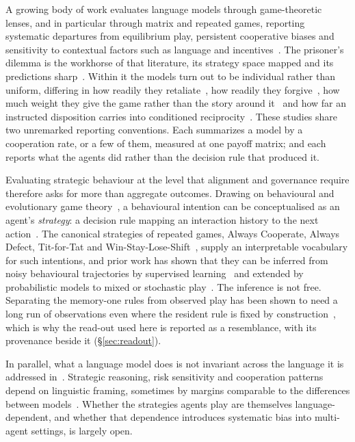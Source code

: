 \documentclass[11pt,a4paper]{article}
\begin{document}
A growing body of work evaluates language models through game-theoretic lenses,
and in particular through matrix and repeated games, reporting systematic
departures from equilibrium play, persistent cooperative biases and sensitivity
to contextual factors such as language and
incentives~\citep{fairgame2025,sun2025gtllm_survey,mao2025alympics,pal2026strategiescooperationdefectionlarge,willis2025will,fan2024can,pires2025large,fu2026optimal}.
The prisoner's dilemma is the workhorse of that literature, its strategy space
mapped and its predictions
sharp~\citep{axelrod1981evolution,axelrod1984evolution,nowak1992tit,nowak1993strategy,nowak2006five,press2012iterated}.
Within it the models turn out to be individual rather than uniform, differing in
how readily they retaliate~\citep{akata2023playing}, how readily they
forgive~\citep{fontana2024nicer}, how much weight they give the game rather than
the story around it~\citep{lore2024strategic} and how far an instructed
disposition carries into conditioned
reciprocity~\citep{phelps2023investigating}. These studies share two unremarked
reporting conventions. Each summarizes a model by a cooperation rate, or a few
of them, measured at one payoff matrix; and each reports what the agents did
rather than the decision rule that produced it.

Evaluating strategic behaviour at the level that alignment and governance
require therefore asks for more than aggregate outcomes. Drawing on behavioural
and evolutionary game theory~\citep{sigmund:2010bo}, a behavioural intention can
be conceptualised as an agent's \emph{strategy}: a decision rule mapping an
interaction history to the next
action~\citep{han2011role,diStefanoIntention2023,Han2012ALIFEjournal,fujimoto2019functional}.
The canonical strategies of repeated games, Always Cooperate, Always Defect,
Tit-for-Tat and Win-Stay-Lose-Shift~\citep{Axelrod1980Effective,sigmund:2010bo},
supply an interpretable vocabulary for such intentions, and prior work has shown
that they can be inferred from noisy behavioural trajectories by supervised
learning~\citep{han2011role,diStefanoIntention2023} and extended by
probabilistic models to mixed or stochastic play~\citep{inferenceStrategies}.
The inference is not free. Separating the memory-one rules from observed play
has been shown to need a long run of observations even where the resident rule
is fixed by construction~\citep{kim2021win}, which is why the read-out used here
is reported as a resemblance, with its provenance beside it
(\S\ref{sec:readout}).

In parallel, what a language model does is not invariant across the language it
is addressed in~\citep{fairgame2025}. Strategic reasoning, risk sensitivity and
cooperation patterns depend on linguistic framing, sometimes by margins
comparable to the differences between
models~\citep{lore2024strategic,buscemi2025llms,buscemi2025strategic}. Whether
the strategies agents play are themselves language-dependent, and whether that
dependence introduces systematic bias into multi-agent settings, is largely
open.
\end{document}
